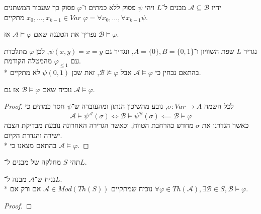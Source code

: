 \question{}
יהיו $\mathcal{A} \subseteq \mathcal{B}$ מבנים ל־$L$ ויהי $\psi$ פסוק ללא כמתים ו־$\varphi$ פסוק כך שעבור המשתנים $x_0, \dots, x_{k - 1} \in Var$ מתקיים $\varphi = \forall x_0, \dots, \forall x_{k - 1} \psi$.

\subquestion{}
נפריך את הטענה שאם $\mathcal{A} \models \varphi$ אז $\mathcal{B} \models \varphi$.
\begin{solution}
	נגדיר $L$ שפת השוויון ו־$A = \{0\}, B = \{0, 1\}$, ונגדיר גם $\psi(x, y) = x = y$, לכן $\varphi$ מתלכדת עם $\varphi_{\le 1}$ מהמטלה הקודמת. \\*
	בהתאם נבחין כי $\mathcal{A} \models \varphi$ אבל $\mathcal{B} \not\models \varphi$, זאת שכן $\psi(0, 1)$ לא מתקיים.
\end{solution}

\subquestion{}
נוכיח שאם $\mathcal{B} \models \varphi$ אז גם $\mathcal{A} \models \varphi$.
\begin{proof}
	לכל השמה $\sigma : Var \to A$, נובע מהשיכון הנתון ומהעובדה ש־$\psi$ חסר כמתים כי
	\[
		\mathcal{A} \models \psi^\mathcal{A}(\sigma)
		\iff \mathcal{B} \models \psi^\mathcal{B}(\sigma)
		\impliedby \mathcal{B} \models \varphi
	\]
	כאשר הגדרנו את $\sigma$ מחדש כהרחבת הטווח, וכאשר הגרירה האחרונה נובעת מבדיקת הצבה ישירה והגדרת הקיום. \\*
	בהתאם מצאנו כי $\mathcal{A} \models \varphi$.
\end{proof}

\question{}
תהי $S$ מחלקה של מבנים ל־$L$.

\subquestion{}
נניח ש־$\mathcal{A}$ מבנה ל־$L$. \\*
נוכיח שמתקיים $\mathcal{A} \in Mod(Th(S))$ אם ורק אם $\forall \varphi \in Th(\mathcal{A}), \exists \mathcal{B} \in S, \mathcal{B} \models \varphi$.
\begin{proof}
	
\end{proof}


